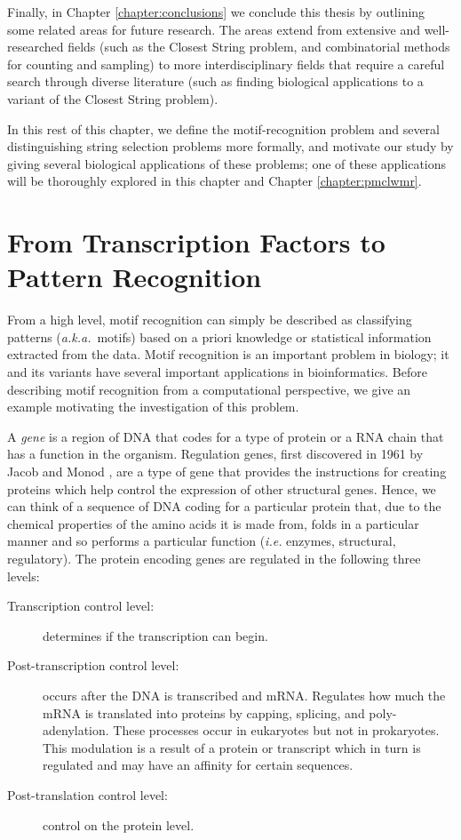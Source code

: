 Finally, in Chapter \ref{chapter:conclusions} we conclude this thesis by outlining some related areas for future research.  The areas extend from extensive and well-researched fields (such as the {\sc Closest String} problem, and combinatorial methods for counting and sampling) to more interdisciplinary fields that require a careful search through diverse literature (such as finding biological applications to a variant of the {\sc Closest String} problem).  
  
In this rest of this chapter, we define the motif-recognition problem and several distinguishing string selection problems more formally, and motivate our study by giving several biological applications of these problems; one of these applications will be thoroughly explored in this chapter and Chapter \ref{chapter:pmclwmr}. 

\section{From Transcription Factors to Pattern  Recognition}

From a high level, motif recognition can simply be described as classifying patterns ({\em a.k.a.}\ motifs) based on a priori knowledge or statistical information extracted from the data.   Motif recognition is an important problem in biology; it and its variants have several important applications in bioinformatics.  Before describing motif recognition from a computational perspective, we give an example motivating the investigation of this problem.   

A {\em gene} is a region of DNA that codes for a type of protein or a RNA chain that has a function in the organism.  Regulation genes, first discovered in 1961 by Jacob and Monod \cite{monod}, are a type of gene that provides the instructions for creating proteins which help control the expression of other structural genes. Hence, we can think of a sequence of DNA coding for a particular protein that, due to the chemical properties of the amino acids it is made from, folds in a particular manner and so performs a particular function ({\em i.e.} enzymes, structural, regulatory). The protein encoding genes are regulated in the following three levels:
\begin{description}
\item[Transcription control level:] determines if the transcription can begin.
\item[Post-transcription control level:] occurs after the DNA is transcribed and mRNA.  Regulates how much the mRNA is translated into proteins by capping, splicing, and poly-adenylation. These processes occur in eukaryotes but not in prokaryotes. This modulation is a result of a protein or transcript which in turn is regulated and may have an affinity for certain sequences.
\item[Post-translation control level:] control on the protein level.  
\end{description}
 
